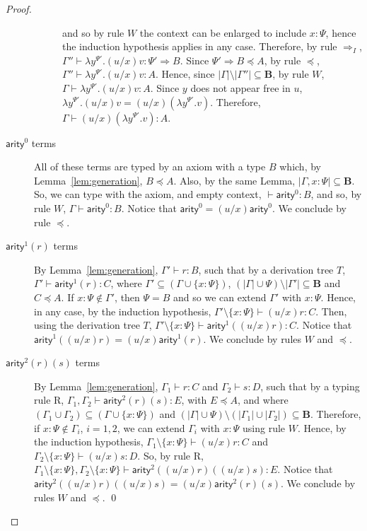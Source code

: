 \documentclass[preprint]{elsarticle}
\newcommand\gB{\ensuremath{\Psi}}
\newcommand\bqtypes{\ensuremath{\mathbf B}}
\newcommand\s[1]{\ensuremath{\mathsf{#1}}}
\begin{document}
\begin{proof}
\begin{description}
\begin{description}
      and so by rule $W$ the context can be enlarged to include $x:\gB$, hence
      the induction hypothesis applies in any case. Therefore, by rule
      $\Rightarrow_I$, $\Gamma''\vdash\lambda y^{\gB'}.(u/x)v:\gB'\Rightarrow
      B$. Since $\gB'\Rightarrow B\preceq A$, by rule $\preceq$,
      $\Gamma''\vdash\lambda y^{\gB'}.(u/x)v:A$. Hence, since
      $|\Gamma|\setminus|\Gamma''|\subseteq\bqtypes$, by rule $W$,
      $\Gamma\vdash\lambda y^{\gB'}.(u/x)v:A$. Since $y$ does not appear free in
      $u$, $\lambda y^{\gB'}.(u/x)v = (u/x)(\lambda y^{\gB'}.v)$. Therefore,
      $\Gamma\vdash(u/x)(\lambda y^{\gB'}.v):A$.
    \end{description}
  \item[$\s{arity}^0$ terms] All of these terms are typed by an axiom with a
    type $B$ which, by Lemma~\ref{lem:generation}, $B\preceq A$. Also, by the
    same Lemma, $|\Gamma,x:\gB|\subseteq\bqtypes$. So, we can type with the axiom,
    and empty context, $\vdash\s{arity}^0:B$, and so, by rule $W$,
    $\Gamma\vdash\s{arity}^0:B$. Notice that $\s{arity}^0=(u/x)\s{arity}^0$. We
    conclude by rule $\preceq$.
  \item[$\s{arity}^1(r)$ terms] By Lemma~\ref{lem:generation}, $\Gamma'\vdash
    r:B$, such that by a derivation tree $T$, $\Gamma'\vdash\s{arity}^1(r):C$,
    where $\Gamma'\subseteq(\Gamma\cup\{x:\gB\})$,
    $(|\Gamma|\cup\gB)\setminus|\Gamma'|\subseteq\bqtypes$ and $C\preceq A$. If
    $x:\gB\notin\Gamma'$, then $\gB=B$ and so we can extend $\Gamma'$ with
    $x:\gB$. Hence, in any case, by the induction hypothesis,
    $\Gamma'\setminus\{x:\gB\}\vdash (u/x)r:C$. Then, using the derivation tree
    $T$, $\Gamma'\setminus\{x:\gB\}\vdash\s{arity}^1((u/x)r):C$. Notice that
    $\s{arity}^1((u/x)r)=(u/x)\s{arity}^1(r)$. We conclude by rules $W$ and
    $\preceq$.

  \item[$\s{arity}^2(r)(s)$ terms] By Lemma~\ref{lem:generation},
    $\Gamma_1\vdash r:C$ and $\Gamma_2\vdash s:D$, such that by a typing rule R,
    $\Gamma_1,\Gamma_2\vdash\s{arity}^2(r)(s):E$, with $E\preceq A$, and where
    $(\Gamma_1\cup\Gamma_2)\subseteq(\Gamma\cup\{x:\gB\})$ and
    $(|\Gamma|\cup\gB)\setminus(|\Gamma_1|\cup|\Gamma_2|)\subseteq\bqtypes$.
    Therefore, if $x:\gB\notin\Gamma_i$, $i=1,2$, we can extend $\Gamma_i$ with
    $x:\gB$ using rule $W$. Hence, by the induction hypothesis,
    $\Gamma_1\setminus\{x:\gB\}\vdash (u/x)r:C$ and
    $\Gamma_2\setminus\{x:\gB\}\vdash (u/x)s:D$. So, by rule R,
    $\Gamma_1\setminus\{x:\gB\},\Gamma_2\setminus\{x:\gB\}\vdash
    \s{arity}^2((u/x)r)((u/x)s):E$. Notice that
    $\s{arity}^2((u/x)r)((u/x)s)=(u/x)\s{arity}^2(r)(s)$. We conclude by rules
    $W$ and $\preceq$.
    \qed
  \end{description}
\end{proof}
\end{document}
